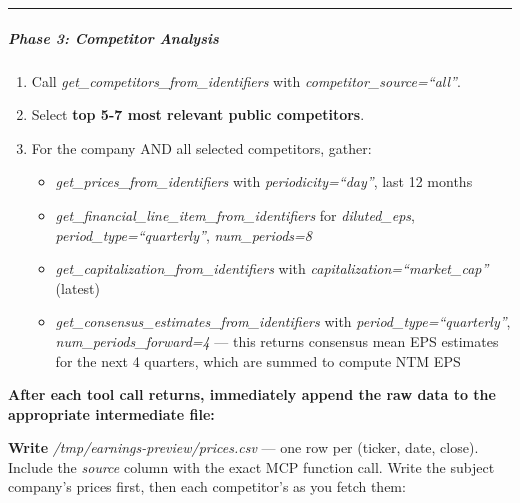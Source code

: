 \documentclass[11pt]{article}
\begin{document}
\vspace{0.5em}\hrule\vspace{0.5em}

\subparagraph{Phase 3: Competitor Analysis}\mbox{}\par

\begin{enumerate}[leftmargin=*,itemsep=2pt,topsep=2pt]
\item {} Call \emph{get\_\allowbreak{}competitors\_\allowbreak{}from\_\allowbreak{}identifiers} with \emph{competitor\_\allowbreak{}source=``all''}.
\item {} Select \textbf{top 5-7 most relevant public competitors}.
\item {} For the company AND all selected competitors, gather:
\begin{itemize}[leftmargin=*,itemsep=2pt,topsep=2pt]
\item {} \emph{get\_\allowbreak{}prices\_\allowbreak{}from\_\allowbreak{}identifiers} with \emph{periodicity=``day''}, last 12 months
\item {} \emph{get\_\allowbreak{}financial\_\allowbreak{}line\_\allowbreak{}item\_\allowbreak{}from\_\allowbreak{}identifiers} for \emph{diluted\_\allowbreak{}eps}, \emph{period\_\allowbreak{}type=``quarterly''}, \emph{num\_\allowbreak{}periods=8}
\item {} \emph{get\_\allowbreak{}capitalization\_\allowbreak{}from\_\allowbreak{}identifiers} with \emph{capitalization=``market\_\allowbreak{}cap''} (latest)
\item {} \emph{get\_\allowbreak{}consensus\_\allowbreak{}estimates\_\allowbreak{}from\_\allowbreak{}identifiers} with \emph{period\_\allowbreak{}type=``quarterly''}, \emph{num\_\allowbreak{}periods\_\allowbreak{}forward=4} — this returns consensus mean EPS estimates for the next 4 quarters, which are summed to compute NTM EPS
\end{itemize}
\end{enumerate}

\textbf{After each tool call returns, immediately append the raw data to the appropriate intermediate file:}


\textbf{Write} \emph{/tmp/earnings-preview/prices.csv} — one row per (ticker, date, close). Include the \emph{source} column with the exact MCP function call. Write the subject company's prices first, then each competitor's as you fetch them:
\end{document}
